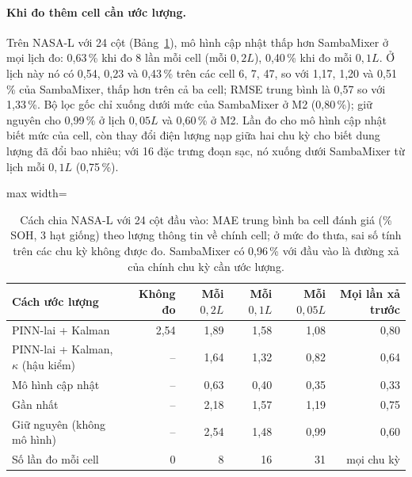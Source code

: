 \documentclass[12pt,a4paper,oneside]{report}
\theoremstyle{plain}
\theoremstyle{definition}
\begin{document}
\paragraph{Khi đo thêm cell cần ước lượng.} Trên NASA-L với 24 cột (Bảng~\ref{tab:e31}), mô hình cập nhật thấp hơn
SambaMixer ở mọi lịch đo: 0{,}63\,\% khi đo 8 lần mỗi cell (mỗi $0{,}2L$), 0{,}40\,\% khi đo mỗi $0{,}1L$. Ở lịch
này nó có 0{,}54, 0{,}23 và 0{,}43\,\% trên các cell 6, 7, 47, so với 1{,}17, 1{,}20 và 0{,}51\,\% của SambaMixer, thấp hơn
trên cả ba cell; RMSE trung bình là 0{,}57 so với 1{,}33\,\%. Bộ lọc gốc chỉ xuống dưới mức của SambaMixer ở M2
(0{,}80\,\%); giữ nguyên cho 0{,}99\,\% ở lịch $0{,}05L$ và 0{,}60\,\% ở M2. Lần đo cho mô hình cập nhật biết mức của
cell, còn thay đổi điện lượng nạp giữa hai chu kỳ cho biết dung lượng đã đổi bao nhiêu; với 16 đặc trưng đoạn sạc, nó
xuống dưới SambaMixer từ lịch mỗi $0{,}1L$ (0{,}75\,\%).

\begin{table}[!htbp]\centering\footnotesize
\caption[NASA-L theo lượng thông tin đo được]{Cách chia NASA-L với 24 cột đầu vào: MAE trung bình ba cell đánh giá (\% SOH, 3 hạt giống) theo lượng thông tin về chính cell; ở mức đo thưa, sai số tính trên các chu kỳ không được đo. SambaMixer có 0{,}96\,\% với đầu vào là đường xả của chính chu kỳ cần ước lượng.}\label{tab:e31}
\begin{adjustbox}{max width=\textwidth}\begin{tabular}{lrrrrr}\toprule
Cách ước lượng & Không đo & Mỗi $0{,}2L$ & Mỗi $0{,}1L$ & Mỗi $0{,}05L$ & Mọi lần xả trước \\\midrule
PINN-lai + Kalman & 2{,}54 & 1{,}89 & 1{,}58 & 1{,}08 & 0{,}80 \\
PINN-lai + Kalman, $\kappa$ (hậu kiểm) & -- & 1{,}64 & 1{,}32 & 0{,}82 & 0{,}64 \\
Mô hình cập nhật & -- & 0{,}63 & 0{,}40 & 0{,}35 & 0{,}33 \\
Gần nhất & -- & 2{,}18 & 1{,}57 & 1{,}19 & 0{,}75 \\
Giữ nguyên (không mô hình) & -- & 2{,}54 & 1{,}48 & 0{,}99 & 0{,}60 \\
Số lần đo mỗi cell & 0 & 8 & 16 & 31 & mọi chu kỳ \\
\bottomrule\end{tabular}\end{adjustbox}\end{table}
\end{document}
